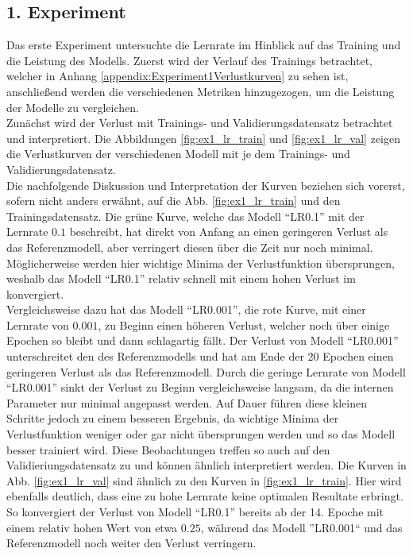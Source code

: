 \subsection{1. Experiment}
\label{subsec:1.Experiment}
Das erste Experiment untersuchte die Lernrate im Hinblick auf das Training und die Leistung des \gls{Modell}s. Zuerst wird der Verlauf des Trainings betrachtet, welcher in Anhang \ref{appendix:Experiment1Verlustkurven} zu sehen ist, anschließend werden die verschiedenen Metriken hinzugezogen, um die Leistung der Modelle zu vergleichen. \\
Zunächst wird der Verlust mit Trainings- und Validierungsdatensatz betrachtet und interpretiert. Die Abbildungen \ref{fig:ex1_lr_train} und \ref{fig:ex1_lr_val} zeigen die Verlustkurven der verschiedenen Modell mit je dem Trainings- und Validierungsdatensatz.\\ 
Die nachfolgende Diskussion und Interpretation der Kurven beziehen sich vorerst, sofern nicht anders erwähnt, auf die Abb. \ref{fig:ex1_lr_train} und den Trainingsdatensatz. Die grüne Kurve, welche das Modell ``LR0.1'' mit der Lernrate $0.1$ beschreibt, hat direkt von Anfang an einen geringeren Verlust als das Referenzmodell, aber verringert diesen über die Zeit nur noch minimal. Möglicherweise werden hier wichtige Minima der Verlustfunktion übersprungen, weshalb das  Modell ``LR0.1'' relativ schnell mit einem hohen Verlust im konvergiert.\\
Vergleichsweise dazu hat das Modell ``LR0.001'', die rote Kurve, mit einer Lernrate von $0.001$, zu Beginn einen höheren Verlust, welcher noch über einige Epochen so bleibt und dann schlagartig fällt. Der Verlust von Modell ``LR0.001'' unterschreitet den des Referenzmodells und hat am Ende der 20 Epochen einen geringeren Verlust als das Referenzmodell. Durch die geringe Lernrate von Modell ``LR0.001'' sinkt der Verlust zu Beginn vergleichsweise langsam, da die internen Parameter nur minimal angepasst werden. Auf Dauer führen diese kleinen Schritte jedoch zu einem besseren Ergebnis, da wichtige Minima der Verlustfunktion weniger oder gar nicht übersprungen werden und so das \gls{Modell} besser trainiert wird. Diese Beobachtungen treffen so auch auf den Validieriungsdatensatz zu und können ähnlich interpretiert werden. Die Kurven in Abb. \ref{fig:ex1_lr_val} sind ähnlich zu den Kurven in \ref{fig:ex1_lr_train}. Hier wird ebenfalls deutlich, dass eine zu hohe Lernrate keine optimalen Resultate erbringt. So konvergiert der Verlust von Modell ``LR0.1'' bereits ab der 14. Epoche mit einem relativ hohen Wert von etwa $0.25$, während das Modell ''LR0.001`` und das Referenzmodell noch weiter den Verlust verringern.


